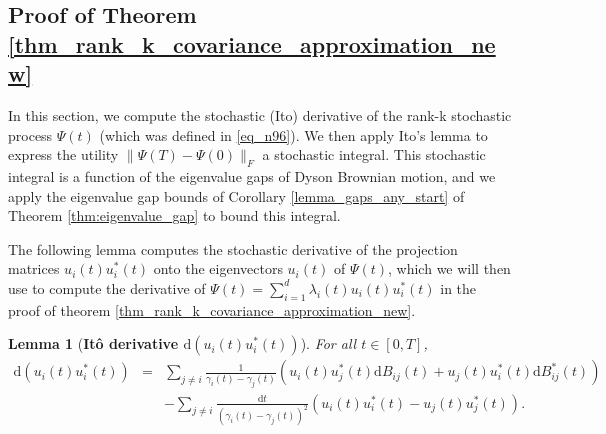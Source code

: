 \documentclass[11pt,letterpaper]{article}
\newtheorem{lemma}[theorem]{Lemma}
\begin{document}
\subsection{Proof of Theorem \ref{thm_rank_k_covariance_approximation_new}} \label{sec_proof_of_rank_k_covariance_approximation_new}


%
In this section, we compute the stochastic (Ito) derivative of the rank-k stochastic process $\Psi(t)$ (which was defined in \eqref{eq_n96}).
%
We then apply Ito's lemma to express the utility $\|\Psi(T) -\Psi(0)\|_F$ a stochastic integral.
%
 This stochastic integral is a function of the eigenvalue gaps of Dyson Brownian motion,
%
 and we apply the eigenvalue gap bounds of Corollary \ref{lemma_gaps_any_start} of Theorem \ref{thm:eigenvalue_gap} to bound this integral.

The following lemma computes the stochastic derivative of the projection matrices $u_i(t) u_i^\ast(t)$ onto the eigenvectors $u_i(t)$ of $\Psi(t)$, which we will then use to compute the derivative of $\Psi(t) = \sum_{i=1}^d \lambda_i(t) u_i(t) u_i^\ast(t)$ in the proof of theorem \ref{thm_rank_k_covariance_approximation_new}.
%

\begin{lemma}[\bf  It\^o derivative $\mathrm{d} (u_i(t) u_i^\ast(t))$]\label{Lemma_projection_differntial}
For all $t \in [0,T]$, 
%
\begin{eqnarray*}
    \mathrm{d}(u_i(t) u_i^\ast(t)) 
     &=& \sum_{j \neq i} \frac{1}{\gamma_i(t) - \gamma_j(t)}(u_i(t) u_j^\ast(t)\mathrm{d}B_{ij}(t) + u_j(t) u_i^\ast(t)\mathrm{d}B_{ij}^\ast(t)) \nonumber \\
    & &- \sum_{j\neq i} \frac{\mathrm{d}t}{(\gamma_i(t)- \gamma_j(t))^2} (u_i(t) u_i^\ast(t) - u_j(t)u_j^\ast(t)).
\end{eqnarray*}
\end{lemma}
%
\end{document}

